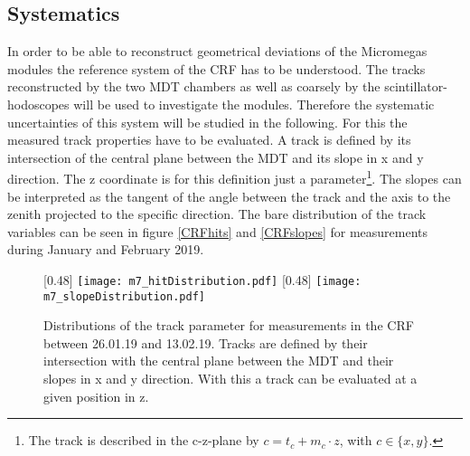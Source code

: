 \documentclass[
twoside,            %
BCOR1.4cm,          %
10pt,               %
headings=normal,    %
headsepline,        %
clearplainpage,		%
final,              %
div=14,
open=right,
bibliography=toc
]{scrreprt}
\begin{document}
\subsection{Systematics}

In order to be able to reconstruct geometrical deviations of the Micromegas modules the reference system of the CRF has to be understood.
The tracks reconstructed by the two MDT chambers as well as coarsely by the scintillator-hodoscopes will be used to investigate the modules.
Therefore the systematic uncertainties of this system will be studied in the following.
For this the measured track properties have to be evaluated.
A track is defined by its intersection of the central plane between the MDT and its slope in x and y direction.
The z coordinate is for this definition just a parameter\footnote{
	The track is described in the c-z-plane by $c = t_{c} + m_{c} \cdot z$, with $c \in \{x,y\}$.
}.
The slopes can be interpreted as the tangent of the angle between the track and the axis to the zenith projected to the specific direction.
The bare distribution of the track variables can be seen in figure \ref{CRFhits} and \ref{CRFslopes} for measurements during January and February 2019.

\begin{figure}[!h]
	\centering
	[0.48\textwidth]
	{\texttt{[image: m7\_hitDistribution.pdf]}}
	\hfill
	[0.48\textwidth]
	{\texttt{[image: m7\_slopeDistribution.pdf]}}
	\vspace{-2mm}
	\caption{
		Distributions of the track parameter for measurements in the CRF between 26.01.19 and 13.02.19.
		Tracks are defined by their intersection with the central plane between the MDT and their slopes in x and y direction.
		With this a track can be evaluated at a given position in z.
	}
\end{figure}
\end{document}
